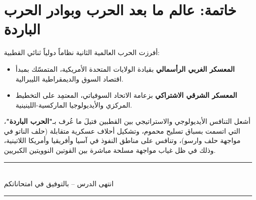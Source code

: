 \documentclass[12pt, a4paper]{article}
\begin{document}
\section{خاتمة: عالم ما بعد الحرب وبوادر الحرب الباردة}

أفرزت الحرب العالمية الثانية نظاماً دولياً ثنائي القطبية:
\begin{itemize}[leftmargin=*, itemsep=3pt]
  \item \textbf{المعسكر الغربي الرأسمالي} بقيادة الولايات المتحدة الأمريكية،
        المتمسّك بمبدأ اقتصاد السوق والديمقراطية الليبرالية.
  \item \textbf{المعسكر الشرقي الاشتراكي} بزعامة الاتحاد السوفياتي،
        المعتمِد على التخطيط المركزي والأيديولوجيا الماركسية-اللينينية.
\end{itemize}

\noindent
أشعل التنافس الأيديولوجي والاستراتيجي بين القطبين فتيلَ ما عُرف بـ\textbf{"الحرب الباردة"}،
التي اتسمت بسباق تسليح محموم، وتشكيل أحلاف عسكرية متقابلة (حلف الناتو في مواجهة
حلف وارسو)، وتنافس على مناطق النفوذ في آسيا وأفريقيا وأمريكا اللاتينية،
وذلك في ظل غياب مواجهة مسلحة مباشرة بين القوتين النوويتين الكبريين.

\vspace{1cm}
\begin{center}
  {\color{mainblue}\rule{0.5\linewidth}{0.8pt}}\\[4pt]
  {\small\color{darkgray}
    انتهى الدرس – بالتوفيق في امتحاناتكم}\\[2pt]
  {\color{mainblue}\rule{0.5\linewidth}{0.8pt}}
\end{center}
\end{document}
